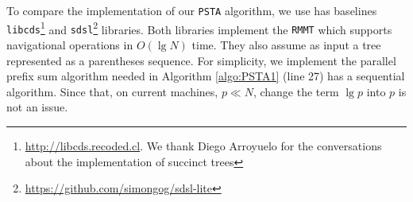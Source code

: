 To compare the implementation of our {\tt PSTA} algorithm, we use has baselines {\tt libcds}\footnote{\url{http://libcds.recoded.cl}. We thank Diego Arroyuelo
for the conversations about the implementation of succinct
trees} and {\tt sdsl}\footnote{\url{https://github.com/simongog/sdsl-lite}} libraries. Both libraries implement the {\tt RMMT} which supports navigational operations in $O(\lg N)$ time. They also assume as input a tree represented as a parentheses sequence. For simplicity, we implement the parallel prefix sum algorithm needed in Algorithm \ref{algo:PSTA1} (line 27) has a sequential algorithm. Since that, on current machines, $ p \ll N$, change the term $\lg p$ into $p$ is not an issue.